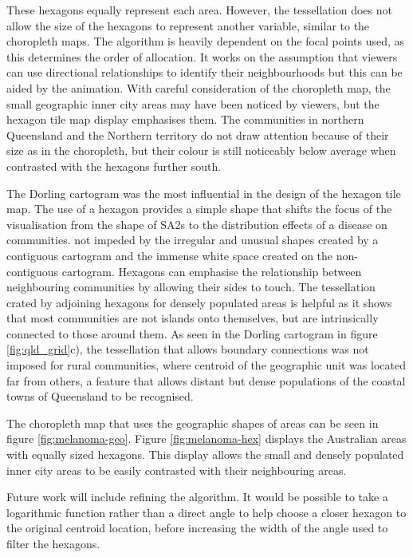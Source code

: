 These hexagons equally represent each area. However, the tessellation
does not allow the size of the hexagons to represent another variable,
similar to the choropleth maps. The algorithm is heavily dependent on
the focal points used, as this determines the order of allocation. It
works on the assumption that viewers can use directional relationships
to identify their neighbourhoods but this can be aided by the animation.
With careful consideration of the choropleth map, the small geographic
inner city areas may have been noticed by viewers, but the hexagon tile
map display emphasises them. The communities in northern Queensland and
the Northern territory do not draw attention because of their size as in
the choropleth, but their colour is still noticeably below average when
contrasted with the hexagons further south.

The Dorling cartogram was the most influential in the design of the
hexagon tile map. The use of a hexagon provides a simple shape that
shifts the focus of the visualisation from the shape of SA2s to the
distribution effects of a disease on communities. not impeded by the
irregular and unusual shapes created by a contiguous cartogram and the
immense white space created on the non-contiguous cartogram. Hexagons
can emphasise the relationship between neighbouring communities by
allowing their sides to touch. The tessellation crated by adjoining
hexagons for densely populated areas is helpful as it shows that most
communities are not islands onto themselves, but are intrinsically
connected to those around them. As seen in the Dorling cartogram in
figure \ref{fig:qld_grid}c), the tessellation that allows boundary
connections was not imposed for rural communities, where centroid of the
geographic unit was located far from others, a feature that allows
distant but dense populations of the coastal towns of Queensland to be
recognised.

The choropleth map that uses the geographic shapes of areas can be seen
in figure \ref{fig:melanoma-geo}. Figure \ref{fig:melanoma-hex} displays
the Australian areas with equally sized hexagons. This display allows
the small and densely populated inner city areas to be easily contrasted
with their neighbouring areas.

Future work will include refining the algorithm. It would be possible to
take a logarithmic function rather than a direct angle to help choose a
closer hexagon to the original centroid location, before increasing the
width of the angle used to filter the hexagons.

